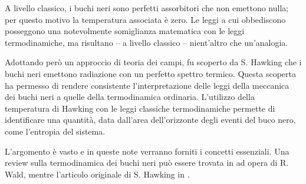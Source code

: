 A livello classico, i buchi neri sono perfetti assorbitori che non emettono nulla; per questo motivo la temperatura associata è zero. Le leggi a cui obbediscono posseggono una notevolmente somiglianza matematica con le leggi termodinamiche, ma risultano -- a livello classico -- nient'altro che un'analogia.

Adottando però un approccio di teoria dei campi, fu scoperto da S. Hawking che i buchi neri emettono radiazione con un perfetto spettro termico. Questa scoperta ha permesso di rendere consistente l'interpretazione delle leggi della meccanica dei buchi neri a quelle della termodinamica ordinaria. L'utilizzo della temperatura di Hawking con le leggi classiche termodinamiche permette di identificare una quantità, data dall'area dell'orizzonte degli eventi del buco nero, come l'entropia del sistema.

L'argomento è vasto e in queste note verranno forniti i concetti essenziali. Una review sulla termodinamica dei buchi neri può essere trovata in \cite{wald_blackholes} ad opera di R. Wald, mentre l'articolo originale di S. Hawking in \cite{hawking_temp}.
